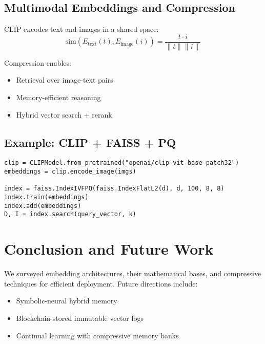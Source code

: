 \documentclass{article}
\begin{document}
\subsection{Multimodal Embeddings and Compression}
CLIP encodes text and images in a shared space:
\[
\text{sim}(E_{\text{text}}(t), E_{\text{image}}(i)) = \frac{t \cdot i}{\|t\|\|i\|}
\]

Compression enables:
\begin{itemize}
    \item Retrieval over image-text pairs
    \item Memory-efficient reasoning
    \item Hybrid vector search + rerank
\end{itemize}

\subsection{Example: CLIP + FAISS + PQ}
\begin{verbatim}
clip = CLIPModel.from_pretrained("openai/clip-vit-base-patch32")
embeddings = clip.encode_image(imgs)

index = faiss.IndexIVFPQ(faiss.IndexFlatL2(d), d, 100, 8, 8)
index.train(embeddings)
index.add(embeddings)
D, I = index.search(query_vector, k)
\end{verbatim}

\section{Conclusion and Future Work}
We surveyed embedding architectures, their mathematical bases, and compressive techniques for efficient deployment. Future directions include:
\begin{itemize}
  \item Symbolic-neural hybrid memory
  \item Blockchain-stored immutable vector logs
  \item Continual learning with compressive memory banks
\end{itemize}
\end{document}
